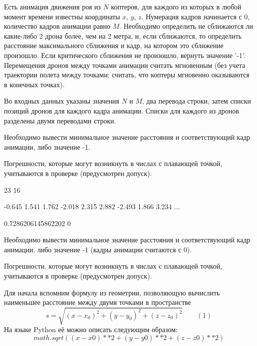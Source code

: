 
Есть анимация движения роя из $N$ коптеров, для каждого из которых в любой момент времени известны координаты $x$, $y$, $z$. Нумерация кадров начинается с 0, количество кадров анимации равно $M$. Необходимо определить не сближаются ли какие-либо 2 дрона более, чем на 2 метра, и, если сближаются, то определить расстояние максимального сближения и кадр, на котором это сближение произошло. Если критического сближения не произошло, вернуть значение '-1'. Перемещения дронов между точками анимации считать мгновенным (без учета траектории полета между точками; считать, что коптеры мгновенно оказываются в конечных точках).


Во входных данных указаны значения $N$ и $M$, два перевода строки, затем списки позиций дронов для каждого кадра анимации. Списки для каждого из дронов разделены двумя переводами строки.

\outputfmtSection

Необходимо вывести минимальное значение расстояния и соответствующий кадр анимации, либо значение -1.

Погрешности, которые могут возникнуть в числах с плавающей точкой, учитываются в проверке (предусмотрен допуск).


\begin{myverbbox}[\small]{\vinput}
    23 16

    -0.645 1.541 1.762
    -2.018 2.315 2.882
    -2.493 1.866 3.234
    ...
\end{myverbbox}
\begin{myverbbox}[\small]{\voutput}
    0.7286206145862202 0
\end{myverbbox}

Необходимо вывести минимальное значение расстояния и соответствующий кадр анимации, либо значение -1 (кадры анимации считаются с 0).

Погрешности, которые могут возникнуть в числах с плавающей точкой, учитываются в проверке (предусмотрен допуск).

\solutionSection

Для начала вспомним формулу из геометрии, позволяющую вычислить наименьшее расстояние между двумя точками в пространстве 
$$s = \sqrt{(x-x_0)^2+(y-y_0)^2+(z-z_0)^2} \qquad (1)$$
На языке Python её можно описать следующим образом:
$$math.sqrt((x-x0)**2+(y-y0)**2+(z-z0)**2)$$

